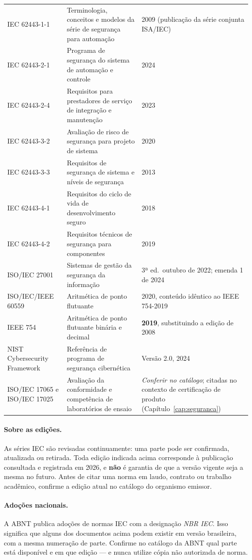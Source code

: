 \begin{longtable}{p{3.6cm} p{5.0cm} p{6.4cm}}
  IEC 62443-1-1 & Terminologia, conceitos e modelos da série de segurança para automação &
    2009 (publicação da série conjunta ISA/IEC) \\
  IEC 62443-2-1 & Programa de segurança do sistema de automação e controle & 2024 \\
  IEC 62443-2-4 & Requisitos para prestadores de serviço de integração e manutenção & 2023 \\
  IEC 62443-3-2 & Avaliação de risco de segurança para projeto de sistema & 2020 \\
  IEC 62443-3-3 & Requisitos de segurança de sistema e níveis de segurança & 2013 \\
  IEC 62443-4-1 & Requisitos do ciclo de vida de desenvolvimento seguro & 2018 \\
  IEC 62443-4-2 & Requisitos técnicos de segurança para componentes & 2019 \\
  ISO/IEC 27001 & Sistemas de gestão da segurança da informação & 3ª ed.\ outubro de 2022; emenda
    1 de 2024 \\
  ISO/IEC/IEEE 60559 & Aritmética de ponto flutuante & 2020, conteúdo idêntico ao IEEE 754-2019 \\
  IEEE 754 & Aritmética de ponto flutuante binária e decimal & \textbf{2019}, substituindo a edição de
    2008 \\
  NIST Cybersecurity Framework & Referência de programa de segurança cibernética & Versão 2.0, 2024 \\
  ISO/IEC 17065 e ISO/IEC 17025 & Avaliação da conformidade e competência de laboratórios de ensaio &
    \emph{Conferir no catálogo}; citadas no contexto de certificação de produto
    (Capítulo~\ref{cap:seguranca}) \\
\end{longtable}

\paragraph{Sobre as edições.} As séries IEC são revisadas continuamente: uma parte pode ser confirmada,
atualizada ou retirada. Toda edição indicada acima corresponde à publicação consultada e registrada em
2026, e \textbf{não} é garantia de que a versão vigente seja a mesma no futuro. Antes de citar uma
norma em laudo, contrato ou trabalho acadêmico, confirme a edição atual no catálogo do organismo
emissor.

\paragraph{Adoções nacionais.} A ABNT publica adoções de normas IEC com a designação \emph{NBR IEC}.
Isso significa que alguns dos documentos acima podem existir em versão brasileira, com a mesma
numeração de parte. Confirme no catálogo da ABNT qual parte está disponível e em que edição --- e
nunca utilize cópia não autorizada de norma.

